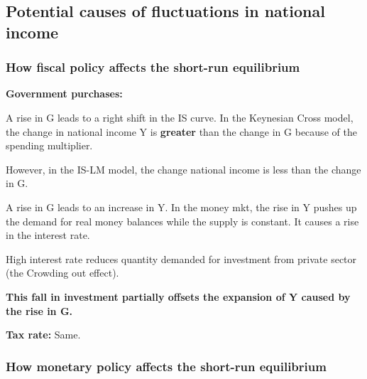 \documentclass[10pt]{article}
\begin{document}
\subsection{Potential causes of fluctuations in national income}

\subsubsection{How fiscal policy affects the short-run equilibrium}
{\textbf {Government purchases:}}

\begin{figure}[H]
\end{figure}



A rise in G leads to a right shift in the IS curve. In the Keynesian Cross model,
the change in national income Y is {\textbf {greater}} than the change in G because of 
the spending multiplier.


However, in the IS-LM model, the change national income is less than the change in G.

A rise in G leads to an increase in Y. In the money mkt, the rise in Y pushes up the
demand for real money balances while the supply is constant. It causes a rise in the
interest rate.

High interest rate reduces quantity demanded for investment from private sector (the Crowding out effect).


{\textbf {This fall in investment partially offsets the expansion of Y caused by the
rise in G.}}



{\textbf {Tax rate:}}
Same.


\subsubsection{How monetary policy affects the short-run equilibrium}














\end{document}
